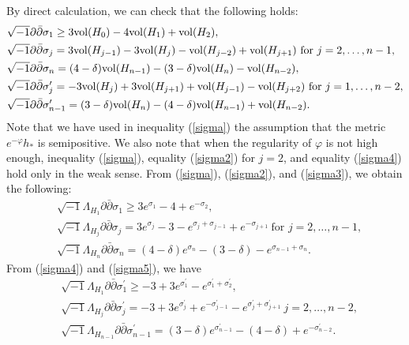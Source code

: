 \documentclass[12pt]{article}
\theoremstyle{definition}
\def\refe{\ast}
\def\vol{{\rm vol}}
\def\inum{{\sqrt{-1}}}
\begin{document}
By direct calculation, we can check that the following holds:
\begin{align}
&\inum\partial\bar{\partial}\sigma_1\geq 3\vol(H_0)-4\vol(H_1)+\vol(H_2), \label{sigma} \\
&\inum \partial\bar{\partial}\sigma_j =3\vol(H_{j-1})-3\vol(H_j)-\vol(H_{j-2})+\vol(H_{j+1})\ \text{for $j=2,\dots, n-1$}, \label{sigma2}\\
&\inum \partial\bar{\partial} \sigma_n=(4-\delta)\vol(H_{n-1})-(3-\delta)\vol(H_n)-\vol(H_{n-2}), \label{sigma3}\\
&\inum \partial \bar{\partial} \sigma^\prime_j=-3\vol(H_j)+3\vol(H_{j+1})+\vol(H_{j-1})-\vol(H_{j+2})\ \text{for $j=1,\dots, n-2$}, \label{sigma4}\\
&\inum \partial \bar{\partial} \sigma^\prime_{n-1}=(3-\delta)\vol(H_n)-(4-\delta)\vol(H_{n-1})+\vol(H_{n-2}). \label{sigma5}
\end{align}
Note that we have used in inequality (\ref{sigma}) the assumption that the metric $e^{-\varphi}h_\refe$ is semipositive. We also note that when the regularity of $\varphi$ is not high enough, inequality (\ref{sigma}), equality (\ref{sigma2}) for $j=2$, and equality (\ref{sigma4}) hold only in the weak sense. %
From (\ref{sigma}), (\ref{sigma2}), and (\ref{sigma3}), we obtain the following:
\begin{align}
&\inum\Lambda_{H_1}\partial \bar{\partial} \sigma_1\geq 3e^{\sigma_1}-4+e^{-\sigma_2}, \label{Hsigma}\\
&\inum \Lambda_{H_j}\partial\bar{\partial}\sigma_j =3e^{\sigma_j}-3-e^{\sigma_j+\sigma_{j-1}}+e^{-\sigma_{j+1}}\ \text{for $j=2,\dots, n-1$}, \label{Hsigma2} \\
&\inum \Lambda_{H_n}\partial\bar{\partial} \sigma_n=(4-\delta)e^{\sigma_n}-(3-\delta)-e^{\sigma_{n-1}+\sigma_n}. \label{Hsigma3}
\end{align}
From (\ref{sigma4}) and (\ref{sigma5}), we have
\begin{align}
&\inum \Lambda_{H_1}\partial \bar{\partial} \sigma^\prime_1\geq -3+3e^{\sigma_1^\prime}-e^{\sigma_1^\prime+\sigma_2^\prime}, \label{Hs}\\
&\inum \Lambda_{H_j}\partial \bar{\partial} \sigma^\prime_j=-3+3e^{\sigma_j^\prime}+e^{-\sigma_{j-1}^\prime}-e^{\sigma_j^\prime+\sigma_{j+1}^\prime}\ \text{$j=2,\dots, n-2$}, \label{Hsigma4}\\
&\inum \Lambda_{H_{n-1}}\partial \bar{\partial} \sigma^\prime_{n-1}=(3-\delta)e^{\sigma_{n-1}^\prime}-(4-\delta)+e^{-\sigma_{n-2}^\prime}. \label{Hsigma5}
\end{align}
\end{document}
